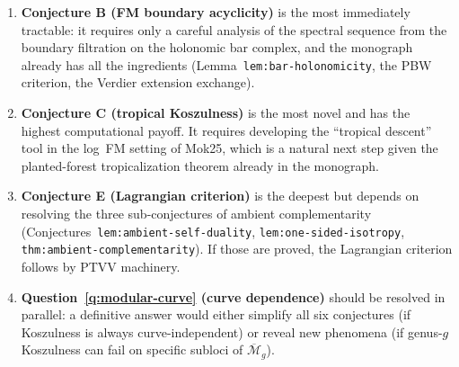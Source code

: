 \documentclass[11pt]{article}
\theoremstyle{plain}
\theoremstyle{definition}
\theoremstyle{remark}
\begin{document}
\begin{enumerate}
\item \textbf{Conjecture B (FM boundary acyclicity)} is the most
  immediately tractable: it requires only a careful analysis of the
  spectral sequence from the boundary filtration on the holonomic
  bar complex, and the monograph already has all the ingredients
  (Lemma~\texttt{lem:bar-holonomicity}, the PBW criterion, the
  Verdier extension exchange).

\item \textbf{Conjecture C (tropical Koszulness)} is the most
  novel and has the highest computational payoff.  It requires
  developing the ``tropical descent'' tool in the log~FM setting
  of Mok25, which is a natural next step given the planted-forest
  tropicalization theorem already in the monograph.

\item \textbf{Conjecture E (Lagrangian criterion)} is the deepest
  but depends on resolving the three sub-conjectures of ambient
  complementarity (Conjectures~\texttt{lem:ambient-self-duality},
  \texttt{lem:one-sided-isotropy},
  \texttt{thm:ambient-complementarity}).  If those are proved, the
  Lagrangian criterion follows by PTVV machinery.

\item \textbf{Question~\ref{q:modular-curve} (curve dependence)}
  should be resolved in parallel: a definitive answer would either
  simplify all six conjectures (if Koszulness is always
  curve-independent) or reveal new phenomena (if genus-$g$
  Koszulness can fail on specific subloci of
  $\overline{\mathcal{M}}_g$).
\end{enumerate}
\end{document}
